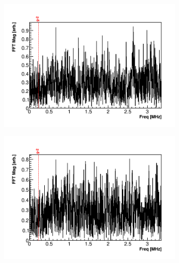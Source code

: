 \begin{figure}[]
\centering
    \begin{subfigure}[t]{0.45\textwidth}
        \centering
        \includegraphics[width=\textwidth]{FFT_TMethod}
        \caption{}
    \end{subfigure}
    \hspace{1mm}
    \begin{subfigure}[t]{0.45\textwidth}
        \centering
        \includegraphics[width=\textwidth]{FFT_AMethod}
        \caption{}
    \end{subfigure}%


\end{figure}
